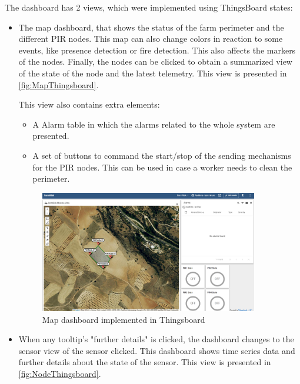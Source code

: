 The dashboard has 2 views, which were implemented using ThingsBoard states:
\begin{itemize}
    \item The map dashboard, that shows the status of the farm perimeter and the different PIR nodes. This map can also change colors in reaction 
    to some events, like presence detection or fire detection. This also affects the markers of the nodes. Finally, the nodes can be clicked to obtain 
    a summarized view of the state of the node and the latest telemetry. This view is presented in \autoref{fig:MapThingsboard}.

    This  view also contains extra elements:
    \begin{itemize}
        \item A Alarm table in which the alarms related to the whole system are presented.
        \item A set of buttons to command the start/stop of the sending mechanisms for the PIR nodes. This can be used in case a worker needs to clean the perimeter.
    \end{itemize}
    \begin{figure}[H]
        \centering
        \includegraphics[width=0.9\textwidth]{./images/8/MapDashboard.png}
        \caption{Map dashboard implemented in Thingsboard}
        \label{fig:MapThingsboard}
    \end{figure}

    \item When any tooltip's "further details" is clicked, the dashboard changes to the sensor view of the sensor clicked. This dashboard 
    shows time series data and further details about the state of the sensor. This view is presented in \autoref{fig:NodeThingsboard}. 


\end{itemize}
